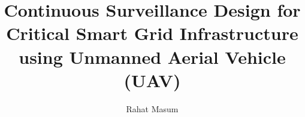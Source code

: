 \documentclass[11pt,twoside]{ttuthesis}
\title{Continuous Surveillance Design for Critical Smart Grid Infrastructure using Unmanned Aerial Vehicle (UAV)}
\author{Rahat Masum}
\theoremstyle{plain}
\begin{document}

\begin{Spacing}{1}
\tableofcontents*  %
\listoftables      %
\listoffigures     %
\lstlistoflistings %
\renewcommand{\nomname}{LIST OF SYMBOLS}
\printnomenclature %
\end{Spacing}

\mainmatter
\end{document}
